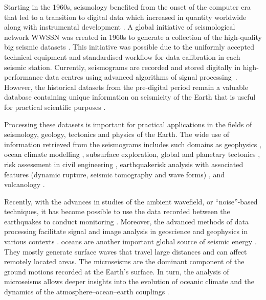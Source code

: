 \documentclass[sensors,article,accept,moreauthors,pdftex]{Definitions/mdpi}
\begin{document}
Starting in the 1960s, seismology benefited from the{ }onset of the computer era that led to a transition to digital data which{ }increased in quantity worldwide {along }with instrumental development \cite{Engdahl2002}. {A global }initiative of seismological network  {WWSSN} was created in 1960s to generate a collection of the high-quality big seismic datasets \citep{OliverMurphy,Ammon2010}. \linebreak This initiative was possible due to the uniformly accepted technical equipment and standardised workflow for data calibration in each {seismic }station. Currently, seismograms are recorded and stored digitally in high-performance data centres using advanced algorithms of signal \mbox{processing \cite{Heiner}}. However, the{ }historical datasets from the pre-{digital period remain }a valuable database containing unique information on seismicity of the Earth that {is useful }for practical scientific purposes \cite{Kanamorietal2010,Bungum,Kanamorietal2019,Lomnitz2004,Ambraseys1983}. 

{Processing these} datasets {is important for} practical applications{ }in the fields of {seismology, geology, }tectonics and{ }physics of the Earth. {The }wide use of {information retrieved from the }seismograms{ }\cite{Ammon2021} includes such{ }domains as geophysics \cite{Kulhanek}, ocean climate \linebreak modelling \cite{Lecocqetal2020}, subsurface exploration, global and planetary tectonics \citep{Crampin,Jackson2002,Leroyetal2010}, risk assessment in civil engineering \citep{Phillips,Pileckietal2017, Kurzeja},{ }earthquake{risk analysis with associated }features (dynamic rupture, seismic tomography and wave forms) \cite{Ahorner,Steinmann,Amorese,Lomnitz,Yuliatmoko},{ and }volcanology \cite{Pezzo}. 

Recently, with the advances in studies of the ambient wavefield, or ``noise''-based techniques, it has become possible to use the data recorded between the earthquakes to conduct monitoring \cite{Ratdomopurbo,Mordret,LemenkovaDebeir02}{. Moreover, the advanced methods of data processing facilitate signal and image analysis in geoscience and geophysics in various contexts} \cite{brenguier2014mapping,Lemenkova202012,Braszusetal2021,LemenkovaDebeir01,Lemenkova202016,Lietal2000}. oceans are {another important }global source of seismic \linebreak energy \cite{Ardhuinetal2011,AucanArdhuin2013,PeureuxArdhuin2016}. They mostly generate surface waves that travel large distances and can {affect remotely located areas}. The microseisms{ }are the dominant component of the ground motions recorded at the {Earth's }surface. In turn, the {analysis }of microseisms {allows deeper} insights into the evolution of oceanic climate \cite{Singh2021,Toyokunietal2015} {and }the dynamics of the atmosphere--ocean--earth couplings \cite{Bromirski1999,Williams,Ardhuinetal2011}. 
\end{document}
